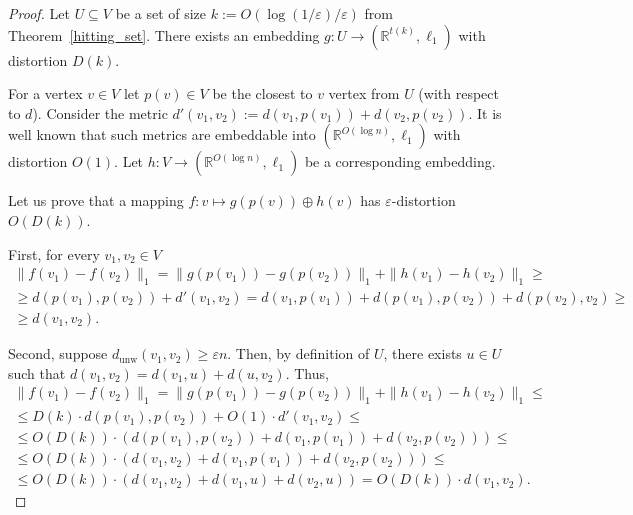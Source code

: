 \documentclass[12pt]{article}
\newcommand{\dunw}{d_{\mathrm{unw}}}
\newcommand{\eps}{\varepsilon}
\begin{document}
    \begin{proof}
        Let $U \subseteq V$ be a set of size $k := O(\log(1 / \eps) / \eps)$ from Theorem~\ref{hitting_set}.
        There exists an embedding $g \colon U \to (\mathbb{R}^{t(k)}, \ell_1)$ with distortion $D(k)$.

        For a vertex $v \in V$ let $p(v) \in V$ be the closest to $v$ vertex from $U$ (with respect to $d$).
        Consider the metric $d'(v_1, v_2) := d(v_1, p(v_1)) + d(v_2, p(v_2))$. It is well known that such metrics
        are embeddable into $(\mathbb{R}^{O(\log n)}, \ell_1)$ with distortion $O(1)$.
        Let $h \colon V \to (\mathbb{R}^{O(\log n)}, \ell_1)$ be a corresponding embedding.

        Let us prove that a mapping $f \colon v \mapsto g(p(v)) \oplus h(v)$
        has $\eps$-distortion $O(D(k))$.

        First, for every $v_1, v_2 \in V$
        \begin{eqnarray*}
            \|f(v_1) - f(v_2)\|_1 = \|g(p(v_1)) - g(p(v_2))\|_1 + \|h(v_1) - h(v_2)\|_1 \geq \\ \geq
            d(p(v_1), p(v_2)) + d'(v_1, v_2) = d(v_1, p(v_1)) + d(p(v_1), p(v_2)) + d(p(v_2), v_2) \geq \\ \geq
            d(v_1, v_2).
        \end{eqnarray*}

        Second, suppose $\dunw(v_1, v_2) \geq \eps n$. Then, by definition of $U$, there exists $u \in U$
        such that $d(v_1, v_2) = d(v_1, u) + d(u, v_2)$.
        Thus,
        \begin{eqnarray*}
            \|f(v_1) - f(v_2)\|_1 = \|g(p(v_1)) - g(p(v_2))\|_1 + \|h(v_1) - h(v_2)\|_1 \leq \\ \leq
            D(k) \cdot d(p(v_1), p(v_2)) + O(1) \cdot d'(v_1, v_2) \leq \\ \leq
            O(D(k)) \cdot (d(p(v_1), p(v_2)) + d(v_1, p(v_1)) + d(v_2, p(v_2))) \leq \\ \leq
            O(D(k)) \cdot (d(v_1, v_2) + d(v_1, p(v_1)) + d(v_2, p(v_2))) \leq \\ \leq
            O(D(k)) \cdot (d(v_1, v_2) + d(v_1, u) + d(v_2, u)) = 
            O(D(k)) \cdot d(v_1, v_2).
        \end{eqnarray*}
    \end{proof}
\end{document}
